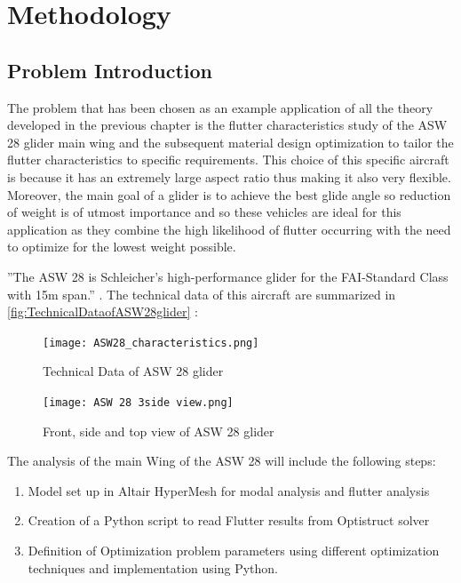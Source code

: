 \chapter{Methodology}
\label{Ch:methodology}

\section{Problem Introduction }
\label{problem-introduction}

The problem that has been chosen as an example application of all the
theory developed in the previous chapter is the flutter characteristics
study of the ASW 28 glider main wing and the subsequent material design
optimization to tailor the flutter characteristics to specific
requirements. This choice of this specific aircraft is because it has an
extremely large aspect ratio thus making it also very flexible.
Moreover, the main goal of a glider is to achieve the best glide angle
so reduction of weight is of utmost importance and so these vehicles are
ideal for this application as they combine the high likelihood of
flutter occurring with the need to optimize for the lowest weight
possible.

''The ASW 28 is Schleicher's high-performance glider for the
FAI-Standard Class with 15m span.'' \cite{asw28}. The technical data of this
aircraft are summarized in \autoref{fig:TechnicalDataofASW28glider} :

\begin{figure}[H]
\centering
\texttt{[image: ASW28\_characteristics.png]}
\caption{Technical Data of ASW 28 glider \cite{asw28}}
\label{fig:TechnicalDataofASW28glider}
\end{figure}

\begin{figure}[H]
\centering
\texttt{[image: ASW 28 3side view.png]}
\caption{Front, side and top view of ASW 28 glider \cite{asw28}}
\end{figure}

The analysis of the main Wing of the ASW 28 will include the following
steps:

\begin{enumerate}
\def\labelenumi{\arabic{enumi}.}
\item
  Model set up in Altair HyperMesh for modal analysis and flutter
  analysis
\item
  Creation of a Python script to read Flutter results from Optistruct
  solver
\item
  Definition of Optimization problem parameters using different
  optimization techniques and implementation using Python.
\end{enumerate}

